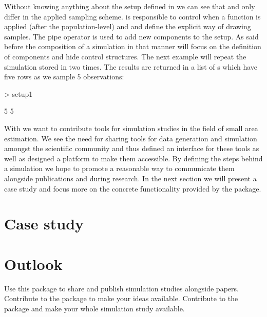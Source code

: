 \documentclass[article]{ajs}
\begin{document}
Without knowing anything about the setup defined in  we can see that  and  only differ in the applied sampling scheme.  is responsible to control when a function is applied (after the population-level) and  and  define the explicit way of drawing samples. The pipe operator \proglang{\%>\%} is used to add new components to the setup. As said before the composition of a simulation in that manner will focus on the definition of components and hide control structures. The next example will repeat the simulation stored in  two times. The results are returned in a list of s which have five rows as we sample 5 observations:

\begin{Schunk}
\begin{Sinput}
> setup1 %
\end{Sinput}
\begin{Soutput}
[1] 5 5
\end{Soutput}
\end{Schunk}

With  we want to contribute tools for simulation studies in the field of small area estimation. We see the need for sharing tools for data generation and simulation amongst the scientific community and thus defined an interface for these tools as well as designed a platform to make them accessible. By defining the steps behind a simulation we hope to promote a reasonable way to communicate them alongside publications and during research. In the next section we will present a case study and focus more on the concrete functionality provided by the package.

\section{Case study}

\section{Outlook}
Use this package to share and publish simulation studies alongside papers. Contribute to the package to make your ideas available. Contribute to the package and make your whole simulation study available. 


%

\end{document}

